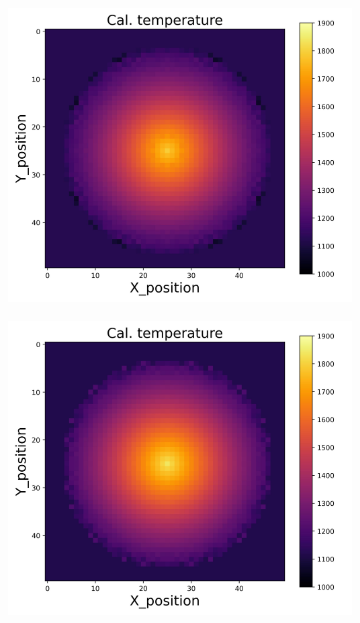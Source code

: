 {\begin{figure}[p]
\begin{minipage}{\textwidth}
\begin{subfigure}{0.325\textwidth}
        \end{subfigure}
    \end{minipage}\\
    \begin{minipage}{\textwidth}
        \centering
        \begin{subfigure}{0.325\textwidth}
            \centering
            \includegraphics[width=\textwidth]{figures/raw_data/22/lin_square/T_cal.jpg}
        \end{subfigure}
        \begin{subfigure}{0.325\textwidth}
            \centering
            \includegraphics[width=\textwidth]{figures/raw_data/23/lin_square/T_cal.jpg}

\end{subfigure}
\end{minipage}
\end{figure}}
